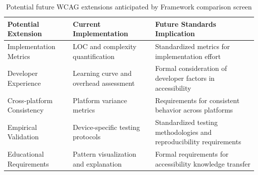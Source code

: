 \begin{table}[ht]
\caption{Potential future WCAG extensions anticipated by Framework comparison screen}
\label{tab:future_wcag_extensions}
\centering
\begin{tabular}{|C{3.5cm}|C{3.5cm}|C{7cm}|}
\hline
\textbf{Potential Extension} & \textbf{Current Implementation} & \textbf{Future Standards Implication} \\
\hline
Implementation Metrics & LOC and complexity quantification & Standardized metrics for implementation effort \\
\hline
Developer Experience & Learning curve and overhead assessment & Formal consideration of developer factors in accessibility \\
\hline
Cross-platform Consistency & Platform variance metrics & Requirements for consistent behavior across platforms \\
\hline
Empirical Validation & Device-specific testing protocols & Standardized testing methodologies and reproducibility requirements \\
\hline
Educational Requirements & Pattern visualization and explanation & Formal requirements for accessibility knowledge transfer \\
\hline
\end{tabular}
\end{table}

\newpage